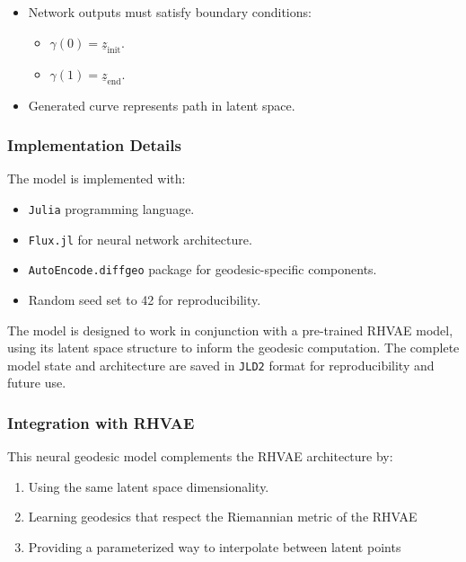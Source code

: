 \documentclass[
]{scrartcl}
\providecommand{\tightlist}{%
  \setlength{\itemsep}{0pt}\setlength{\parskip}{0pt}}\usepackage{longtable,booktabs,array}
\begin{document}
\begin{refsection}
\begin{enumerate}
  \begin{itemize}
  \tightlist
  \item
    Network outputs must satisfy boundary conditions:

    \begin{itemize}
    \tightlist
    \item
      \(\gamma(0) = \underline{z}_{\text{init}}\).
    \item
      \(\gamma(1) = \underline{z}_{\text{end}}\).
    \end{itemize}
  \item
    Generated curve represents path in latent space.
  \end{itemize}
\end{enumerate}

\subsubsection{Implementation Details}\label{implementation-details-2}

The model is implemented with:

\begin{itemize}
\item
  \texttt{Julia} programming language.
\item
  \texttt{Flux.jl} for neural network architecture.
\item
  \texttt{AutoEncode.diffgeo} package for geodesic-specific components.
\item
  Random seed set to 42 for reproducibility.
\end{itemize}

The model is designed to work in conjunction with a pre-trained RHVAE
model, using its latent space structure to inform the geodesic
computation. The complete model state and architecture are saved in
\texttt{JLD2} format for reproducibility and future use.

\subsubsection{Integration with RHVAE}\label{integration-with-rhvae}

This neural geodesic model complements the RHVAE architecture by:

\begin{enumerate}
\def\labelenumi{\arabic{enumi}.}
\item
  Using the same latent space dimensionality.
\item
  Learning geodesics that respect the Riemannian metric of the RHVAE
\item
  Providing a parameterized way to interpolate between latent points
\end{enumerate}


\end{refsection}
\end{document}
